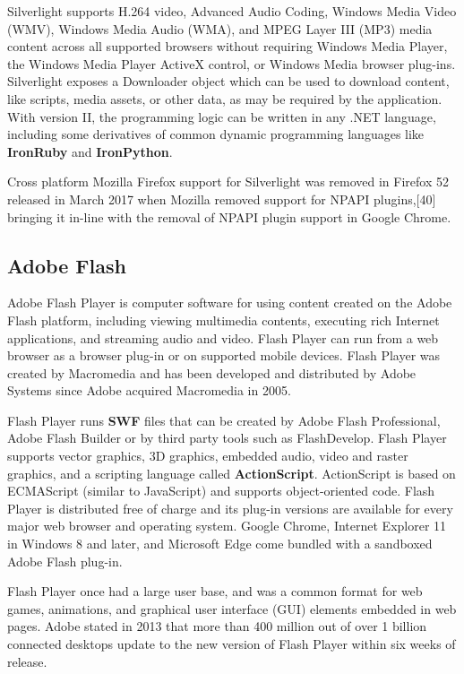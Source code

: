 Silverlight supports H.264 video, Advanced Audio Coding, Windows Media Video (WMV), Windows Media Audio (WMA), and MPEG Layer III (MP3) 
media content across all supported browsers without requiring Windows Media Player, the Windows Media Player ActiveX control, or Windows Media browser plug-ins. 
Silverlight exposes a Downloader object which can be used to download content, like scripts, media assets, or other data, as may be required by the application.
With version II, the programming logic can be written in any .NET language, including some derivatives of common dynamic programming languages like \textbf{IronRuby} and \textbf{IronPython}.

Cross platform Mozilla Firefox support for Silverlight was removed in Firefox 52 released in March 2017 when Mozilla removed support for NPAPI plugins,[40] bringing it in-line with the removal of NPAPI plugin support in Google Chrome.

\subsection{Adobe Flash} \cite{Wiki_Flash}

Adobe Flash Player is computer software for using content created on the Adobe Flash platform, including viewing multimedia contents, executing rich Internet applications, and streaming audio and video. 
Flash Player can run from a web browser as a browser plug-in or on supported mobile devices. 
Flash Player was created by Macromedia and has been developed and distributed by Adobe Systems since Adobe acquired Macromedia in 2005. 

Flash Player runs \textbf{SWF} files that can be created by Adobe Flash Professional, Adobe Flash Builder or by third party tools such as FlashDevelop. 
Flash Player supports vector graphics, 3D graphics, embedded audio, video and raster graphics, and a scripting language called \textbf{ActionScript}. 
ActionScript is based on ECMAScript (similar to JavaScript) and supports object-oriented code. 
Flash Player is distributed free of charge and its plug-in versions are available for every major web browser and operating system. 
Google Chrome, Internet Explorer 11 in Windows 8 and later, and Microsoft Edge come bundled with a sandboxed Adobe Flash plug-in.

Flash Player once had a large user base, and was a common format for web games, animations, and graphical user interface (GUI) elements embedded in web pages. 
Adobe stated in 2013 that more than 400 million out of over 1 billion connected desktops update to the new version of Flash Player within six weeks of release. 

